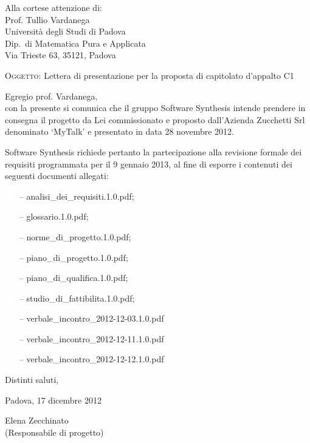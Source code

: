 \documentclass[a4paper,10pt]{letter}
\begin{document}
\begin{flushright}
\begin{minipage}[t]{.5\textwidth}
Alla cortese attenzione di:\\
Prof. Tullio Vardanega\\
Università degli Studi di Padova\\
Dip.~di Matematica Pura e Applicata\\
Via Trieste 63, 35121, Padova\\
\end{minipage}
\end{flushright}

\bigskip
\textsc{Oggetto:} Lettera di presentazione per la proposta di capitolato d’appalto C1
\bigskip

\noindent{}Egregio prof. Vardanega,\\
\hspace*{11em} con la presente si comunica che il gruppo Software Synthesis intende prendere in consegna il progetto da Lei commissionato e proposto dall'Azienda Zucchetti Srl denominato `MyTalk' e presentato in data 28 novembre 2012.

Software Synthesis richiede pertanto la partecipazione alla revisione formale dei requisiti programmata per il 9 gennaio 2013, al fine di esporre i contenuti dei seguenti documenti allegati:

\begin{itemize}
\item[--] analisi\_dei\_requisiti.1.0.pdf;
\item[--] glossario.1.0.pdf;
\item[--] norme\_di\_progetto.1.0.pdf;
\item[--] piano\_di\_progetto.1.0.pdf;
\item[--] piano\_di\_qualifica.1.0.pdf;
\item[--] studio\_di\_fattibilita.1.0.pdf;
\item[--] verbale\_incontro\_2012-12-03.1.0.pdf
\item[--] verbale\_incontro\_2012-12-11.1.0.pdf
\item[--] verbale\_incontro\_2012-12-12.1.0.pdf
\end{itemize}

\bigskip

Distinti saluti,

\bigskip
Padova, 17 dicembre 2012

\bigskip

\begin{flushright}
\begin{minipage}[t]{.35\textwidth}
Elena Zecchinato\\
(Responsabile di progetto)
\end{minipage}
\end{flushright}
\end{document}
